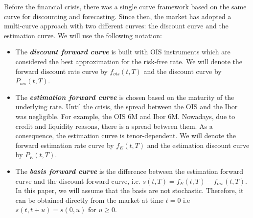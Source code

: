 \documentclass[a4paper,10pt]{article}
\newcommand{\1}{\mathbf{1}}
\begin{document}

Before the financial crisis, there was a single curve framework based on the same curve for discounting and forecasting. Since then, the market has adopted a multi-curve approach with two different curves: the discount curve and the estimation curve. We will use the following notation:
\begin{itemize}
	\item The \textbf{\textit{discount forward curve}} is built with OIS instruments which are considered the best approximation for the risk-free rate. We will denote the forward discount rate curve by $f_{ois}(t,T)$ and the discount curve by $P_{ois}(t,T)$.

	\item The \textbf{\textit{estimation forward curve}} is chosen based on the maturity of the underlying rate. Until the crisis, the spread between the OIS and the Ibor was negligible. For example, the OIS 6M and Ibor 6M. Nowadays, due to credit and liquidity reasons, there is a spread between them. As a consequence, the estimation curve is tenor-dependent. We will denote the forward estimation rate curve by $f_{E}(t,T)$ and the estimation discount curve by $P_{E}(t,T)$. 
	
	\item The \textbf{\textit{basis forward curve}} is the difference between the estimation forward curve and the discount forward curve, i.e. $s(t,T)= f_{E}(t,T) - f_{ois}(t,T)$. In this paper, we will assume that the basis are not stochastic. Therefore, it can be obtained directly from the market at time $t=0$ i.e $s(t,t + u)= s(0,u)$ for $u \geq 0$.
	\end{itemize}
\end{document}
